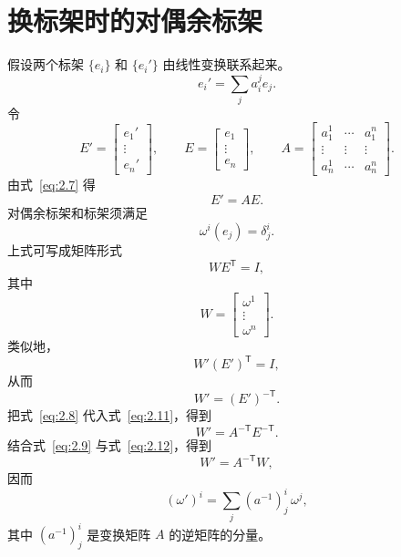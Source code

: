 \section{换标架时的对偶余标架}
假设两个标架 $\{e_i\}$ 和 $\{e_i'\}$ 由线性变换联系起来。
\begin{equation*}
  e_i'=\sum_j a_i^j e_j.
  \tag{2.7}\label{eq:2.7}
\end{equation*}
令
\[
  E'=\begin{bmatrix}e_1'\\ \vdots\\ e_n'\end{bmatrix},
  \qquad
  E=\begin{bmatrix}e_1\\ \vdots\\ e_n\end{bmatrix},
  \qquad
  A=\begin{bmatrix}a_1^1&\cdots&a_1^n\\ \vdots&\vdots&\vdots\\ a_n^1&\cdots&a_n^n\end{bmatrix}.
\]
由式~\eqref{eq:2.7} 得
\begin{equation*}
  E'=AE.
  \tag{2.8}\label{eq:2.8}
\end{equation*}
对偶余标架和标架须满足
\[
  \omega^i(e_j)=\delta_j^i.
\]
上式可写成矩阵形式
\begin{equation*}
  WE^{\mathsf T}=I,
  \tag{2.9}\label{eq:2.9}
\end{equation*}
其中
\[
  W=\begin{bmatrix}\omega^1\\ \vdots\\ \omega^n\end{bmatrix}.
\]
类似地，
\begin{equation*}
  W'(E')^{\mathsf T}=I,
  \tag{2.10}\label{eq:2.10}
\end{equation*}
从而
\begin{equation*}
  W'=(E')^{-\mathsf T}.
  \tag{2.11}\label{eq:2.11}
\end{equation*}
把式~\eqref{eq:2.8} 代入式~\eqref{eq:2.11}，得到
\begin{equation*}
  W'=A^{-\mathsf T}E^{-\mathsf T}.
  \tag{2.12}\label{eq:2.12}
\end{equation*}
结合式~\eqref{eq:2.9} 与式~\eqref{eq:2.12}，得到
\begin{equation*}
  W'=A^{-\mathsf T}W,
  \tag{2.13}\label{eq:2.13}
\end{equation*}
因而
\begin{equation*}
  (\omega')^i=\sum_j(a^{-1})^i_j\,\omega^j,
  \tag{2.14}\label{eq:2.14}
\end{equation*}
其中 $(a^{-1})^i_j$ 是变换矩阵 $A$ 的逆矩阵的分量。
